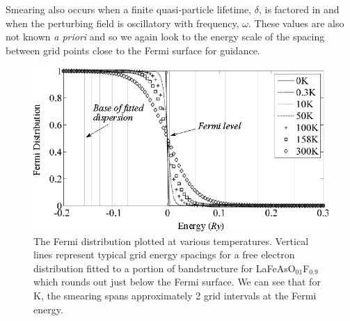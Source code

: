 Smearing also occurs when a finite quasi-particle lifetime, $\delta$, is factored in and when the perturbing field is oscillatory with frequency, $\omega$. These values are also not known \textit{a priori} and so we again look to the energy scale of the spacing between grid points close to the Fermi surface for guidance.

\begin{figure}[htbp]
    \begin{center}
        \includegraphics[scale=0.9]{Chapter-ExperimentalTechnique/Figures/Susceptibility/TempSmearing/TempSmearing}
        \caption{The Fermi distribution plotted at various temperatures. Vertical lines represent typical grid energy spacings for a free electron distribution fitted to a portion of bandstructure for LaFeAsO$_{01}$F$_{0.9}$ which rounds out just below the Fermi surface. We can see that for \unit[158]{K}, the smearing spans approximately 2 grid intervals at the Fermi energy.}
        \label{Fig:Exp:SusceptibilityTempSmearing}
    \end{center}
\end{figure}

